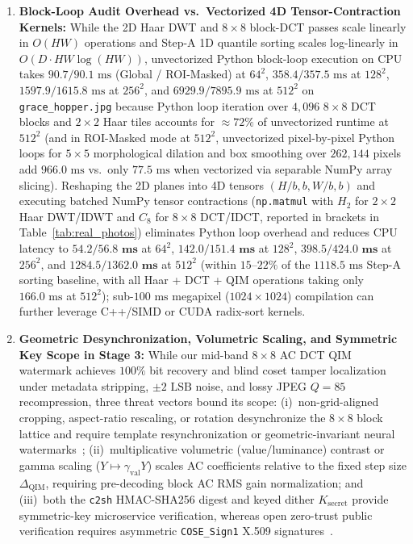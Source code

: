\documentclass[conference,10pt]{IEEEtran}
\begin{document}
\begin{enumerate}
    \item \textbf{Block-Loop Audit Overhead vs.\ Vectorized 4D Tensor-Contraction Kernels:} While the 2D Haar DWT and $8\times 8$ block-DCT passes scale linearly in $O(HW)$ operations and Step-A 1D quantile sorting scales log-linearly in $O(D \cdot HW \log(HW))$, unvectorized Python block-loop execution on CPU takes $90.7 / 90.1\text{ ms}$ (Global / ROI-Masked) at $64^2$, $358.4 / 357.5\text{ ms}$ at $128^2$, $1597.9 / 1615.8\text{ ms}$ at $256^2$, and $6929.9 / 7895.9\text{ ms}$ at $512^2$ on \texttt{grace\_hopper.jpg} because Python loop iteration over $4{,}096$ $8\times 8$ DCT blocks and $2\times 2$ Haar tiles accounts for $\approx 72\%$ of unvectorized runtime at $512^2$ (and in ROI-Masked mode at $512^2$, unvectorized pixel-by-pixel Python loops for $5\times 5$ morphological dilation and box smoothing over $262{,}144$ pixels add $966.0\text{ ms}$ vs.\ only $77.5\text{ ms}$ when vectorized via separable NumPy array slicing). Reshaping the 2D planes into 4D tensors $(H/b, b, W/b, b)$ and executing batched NumPy tensor contractions (\texttt{np.matmul} with $H_2$ for $2\times 2$ Haar DWT/IDWT and $C_8$ for $8\times 8$ DCT/IDCT, reported in brackets in Table~\ref{tab:real_photos}) eliminates Python loop overhead and reduces CPU latency to $\mathbf{54.2 / 56.8\text{ ms}}$ at $64^2$, $\mathbf{142.0 / 151.4\text{ ms}}$ at $128^2$, $\mathbf{398.5 / 424.0\text{ ms}}$ at $256^2$, and $\mathbf{1284.5 / 1362.0\text{ ms}}$ at $512^2$ (within $15\text{--}22\%$ of the $1118.5\text{ ms}$ Step-A sorting baseline, with all Haar + DCT + QIM operations taking only $166.0\text{ ms}$ at $512^2$); sub-$100\text{ ms}$ megapixel ($1024\times 1024$) compilation can further leverage C++/SIMD or CUDA radix-sort kernels.
    \item \textbf{Geometric Desynchronization, Volumetric Scaling, and Symmetric Key Scope in Stage 3:} While our mid-band $8\times 8$ AC DCT QIM watermark achieves $100\%$ bit recovery and blind coset tamper localization under metadata stripping, $\pm 2\text{ LSB}$ noise, and lossy JPEG $Q=85$ recompression, three threat vectors bound its scope: (i)~non-grid-aligned cropping, aspect-ratio rescaling, or rotation desynchronize the $8\times 8$ block lattice and require template resynchronization or geometric-invariant neural watermarks~\cite{bui2023trustmark,gowal2025,sander2025wam}; (ii)~multiplicative volumetric (value/luminance) contrast or gamma scaling ($Y \mapsto \gamma_{\text{val}} Y$) scales AC coefficients relative to the fixed step size $\Delta_{\text{QIM}}$, requiring pre-decoding block AC RMS gain normalization; and (iii)~both the \texttt{c2sh} HMAC-SHA256 digest and keyed dither $K_{\text{secret}}$ provide symmetric-key microservice verification, whereas open zero-trust public verification requires asymmetric \texttt{COSE\_Sign1} X.509 signatures~\cite{c2pa2024}.
\end{enumerate}
\end{document}
